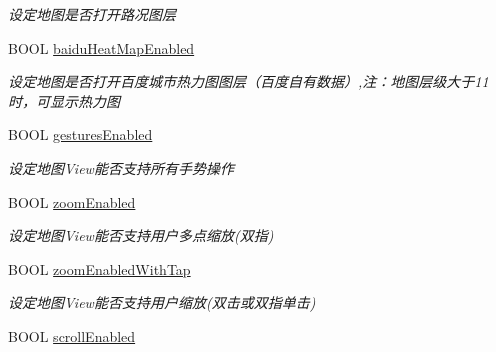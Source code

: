 \begin{DoxyCompactItemize}
\begin{DoxyCompactList}\small\item\em 设定地图是否打开路况图层 \end{DoxyCompactList}\item 
\hypertarget{interface_b_m_k_map_view_a9bc2c71421081064f9dbbd2a656172ff}{}B\+O\+O\+L \hyperlink{interface_b_m_k_map_view_a9bc2c71421081064f9dbbd2a656172ff}{baidu\+Heat\+Map\+Enabled}\label{interface_b_m_k_map_view_a9bc2c71421081064f9dbbd2a656172ff}

\begin{DoxyCompactList}\small\item\em 设定地图是否打开百度城市热力图图层（百度自有数据）,注：地图层级大于11时，可显示热力图 \end{DoxyCompactList}\item 
\hypertarget{interface_b_m_k_map_view_a8aeba699d276e36aa83cf0ab9bb771c2}{}B\+O\+O\+L \hyperlink{interface_b_m_k_map_view_a8aeba699d276e36aa83cf0ab9bb771c2}{gestures\+Enabled}\label{interface_b_m_k_map_view_a8aeba699d276e36aa83cf0ab9bb771c2}

\begin{DoxyCompactList}\small\item\em 设定地图\+View能否支持所有手势操作 \end{DoxyCompactList}\item 
\hypertarget{interface_b_m_k_map_view_acf8472da994b76cef21a40673a41f774}{}B\+O\+O\+L \hyperlink{interface_b_m_k_map_view_acf8472da994b76cef21a40673a41f774}{zoom\+Enabled}\label{interface_b_m_k_map_view_acf8472da994b76cef21a40673a41f774}

\begin{DoxyCompactList}\small\item\em 设定地图\+View能否支持用户多点缩放(双指) \end{DoxyCompactList}\item 
\hypertarget{interface_b_m_k_map_view_a11368ac9a8b66b2bc1c3e552e368939e}{}B\+O\+O\+L \hyperlink{interface_b_m_k_map_view_a11368ac9a8b66b2bc1c3e552e368939e}{zoom\+Enabled\+With\+Tap}\label{interface_b_m_k_map_view_a11368ac9a8b66b2bc1c3e552e368939e}

\begin{DoxyCompactList}\small\item\em 设定地图\+View能否支持用户缩放(双击或双指单击) \end{DoxyCompactList}\item 
\hypertarget{interface_b_m_k_map_view_adc7ae3120b0edf096ac0eb42f13ed93a}{}B\+O\+O\+L \hyperlink{interface_b_m_k_map_view_adc7ae3120b0edf096ac0eb42f13ed93a}{scroll\+Enabled}\label{interface_b_m_k_map_view_adc7ae3120b0edf096ac0eb42f13ed93a}


\end{DoxyCompactItemize}
